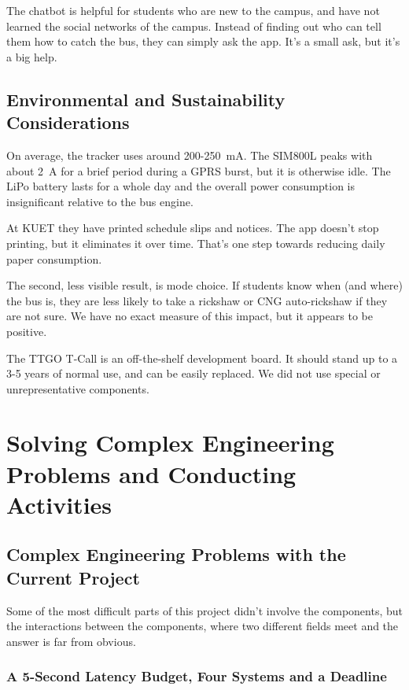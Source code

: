 \documentclass[12pt,a4paper]{report}
\begin{document}
The chatbot is helpful for students who are new to the campus, and have not learned the social networks of the campus. Instead of finding out who can tell them how to catch the bus, they can simply ask the app. It's a small ask, but it's a big help.

\section{Environmental and Sustainability Considerations}

On average, the tracker uses around 200-250~mA. The SIM800L peaks with about 2~A for a brief period during a GPRS burst, but it is otherwise idle. The LiPo battery lasts for a whole day and the overall power consumption is insignificant relative to the bus engine.

At KUET they have printed schedule slips and notices. The app doesn't stop printing, but it eliminates it over time. That's one step towards reducing daily paper consumption.

The second, less visible result, is mode choice. If students know when (and where) the bus is, they are less likely to take a rickshaw or CNG auto-rickshaw if they are not sure. We have no exact measure of this impact, but it appears to be positive.

The TTGO T-Call is an off-the-shelf development board. It should stand up to a 3-5 years of normal use, and can be easily replaced. We did not use special or unrepresentative components.

\chapter{Solving Complex Engineering Problems and Conducting Activities}

\section{Complex Engineering Problems with the Current Project}

Some of the most difficult parts of this project didn't involve the components, but the interactions between the components, where two different fields meet and the answer is far from obvious.

\subsection*{A 5-Second Latency Budget, Four Systems and a Deadline}
\end{document}
